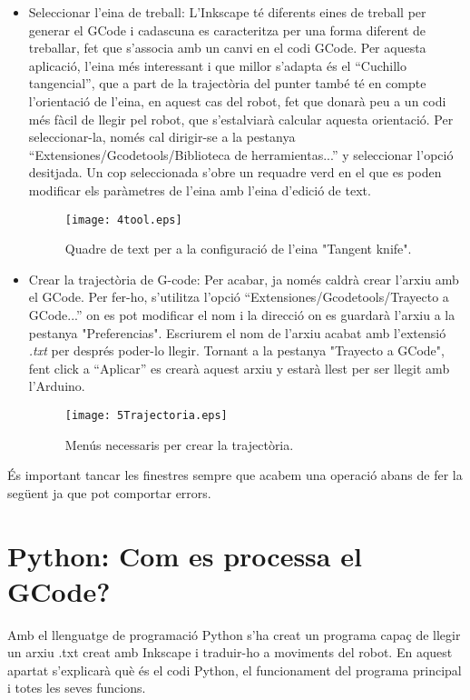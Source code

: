 \begin{itemize}
	\item Seleccionar l'eina de treball: L'Inkscape té diferents eines de treball per generar el GCode i cadascuna es caracteritza per una forma diferent de treballar, fet que s'associa amb un canvi en el codi GCode. Per aquesta aplicació, l'eina més interessant i que millor s'adapta és el “Cuchillo tangencial”, que a part de la trajectòria del punter també té en compte l'orientació de l'eina, en aquest cas del robot, fet que donarà peu a un codi més fàcil de llegir pel robot, que s'estalviarà calcular aquesta orientació. Per seleccionar-la, només cal dirigir-se a la pestanya “Extensiones/Gcodetools/Biblioteca de herramientas...” y seleccionar l'opció desitjada. Un cop seleccionada s'obre un requadre verd en el que es poden modificar els paràmetres de l'eina amb l'eina d'edició de text.
	
	\begin{figure}[H]
		\centering
		\texttt{[image: 4tool.eps]}
		\caption{Quadre de text per a la configuració de l'eina "Tangent knife".}
		\label{fig:tool}
	\end{figure}
	
	\item Crear la trajectòria de G-code: Per acabar, ja només caldrà crear l'arxiu amb el GCode. Per fer-ho, s'utilitza l'opció “Extensiones/Gcodetools/Trayecto a GCode...” on es pot modificar el nom i la direcció on es guardarà l'arxiu a la pestanya "Preferencias". Escriurem el nom de l'arxiu acabat amb l'extensió \emph{.txt} per després poder-lo llegir. Tornant a la pestanya "Trayecto a GCode", fent click a  “Aplicar” es crearà aquest arxiu y estarà llest per ser llegit amb l'Arduino.
	
	\begin{figure}[H]
		\centering
		\texttt{[image: 5Trajectoria.eps]}
		\caption{Menús necessaris per crear la trajectòria.}
		\label{fig:trayecto}
	\end{figure}
	
\end{itemize}
És important tancar les finestres sempre que acabem una operació abans de fer la següent ja que pot comportar errors. 

\section{Python: Com es processa el GCode?}

Amb el llenguatge de programació Python s’ha creat un programa capaç de llegir un arxiu .txt creat amb Inkscape i traduir-ho a moviments del robot. En aquest apartat s’explicarà què és el codi Python, el funcionament del programa principal i totes les seves funcions. 


